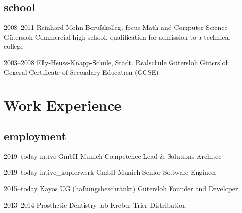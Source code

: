 \documentclass[]{friggeri-cv} %
\begin{document}
\subsection{school}

	\begin{entrylist}
	
	\entry
	{2008--2011}
	{Reinhard Mohn Berufskolleg, focus Math and Computer Science}
	{G\"{u}tersloh}
	{Commercial high school, qualification for admission to a technical college}
	
	
	\entry
	{2003--2008}
	{Elly-Heuss-Knapp-Schule, St\"{a}dt. Realschule G\"{u}tersloh}
	{G\"{u}tersloh}
	{General Certificate of Secondary Education (GCSE)}


\end{entrylist}


\section{Work Experience}

\subsection{employment}

	
	\begin{entrylist}
		
	\entry
	{2019--today}
	{intive GmbH}
	{Munich}
	{Competence Lead \& Solutions Architec}
	
	
	\entry
	{2019--today}
	{intive\_kupferwerk GmbH}
	{Munich}
	{Senior Software Engineer}
		
	
	\entry
	{2015--today}
	{Kayos UG (haftungsbeschr\"{a}nkt)}
	{G\"{u}tersloh}
	{Founder and Developer}

	
	\entry
	{2013--2014}
	{Prosthetic Dentistry lab Kreber}
	{Trier}
	{Distribution}


\end{entrylist}
\end{document}
